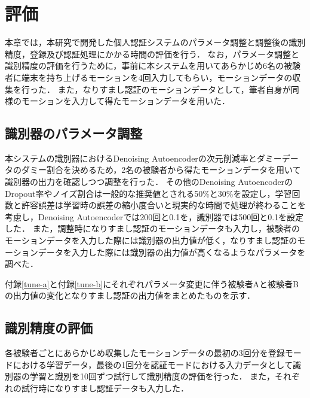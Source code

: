 \chapter{評価}
本章では，本研究で開発した個人認証システムのパラメータ調整と調整後の識別精度，登録及び認証処理にかかる時間の評価を行う．
なお，パラメータ調整と識別精度の評価を行うために，事前に本システムを用いてあらかじめ6名の被験者に端末を持ち上げるモーションを4回入力してもらい，モーションデータの収集を行った．
また，なりすまし認証のモーションデータとして，筆者自身が同様のモーションを入力して得たモーションデータを用いた．

\section{識別器のパラメータ調整}
本システムの識別器におけるDenoising Autoencoderの次元削減率とダミーデータのダミー割合を決めるため，2名の被験者から得たモーションデータを用いて識別器の出力を確認しつつ調整を行った．
その他のDenoising AutoencoderのDropout率やノイズ割合は一般的な推奨値とされる50\%と30\%を設定し，学習回数と許容誤差は学習時の誤差の縮小度合いと現実的な時間で処理が終わることを考慮し，Denoising Autoencoderでは200回と0.1を，識別器では500回と0.1を設定した．
また，調整時になりすまし認証のモーションデータも入力し，被験者のモーションデータを入力した際には識別器の出力値が低く，なりすまし認証のモーションデータを入力した際には識別器の出力値が高くなるようなパラメータを調べた．

付録\ref{tune-a}と付録\ref{tune-b}にそれぞれパラメータ変更に伴う被験者Aと被験者Bの出力値の変化となりすまし認証の出力値をまとめたものを示す．


\section{識別精度の評価}
各被験者ごとにあらかじめ収集したモーションデータの最初の3回分を登録モードにおける学習データ，最後の1回分を認証モードにおける入力データとして識別器の学習と識別を10回ずつ試行して識別精度の評価を行った．
また，それぞれの試行時になりすまし認証データも入力した．

